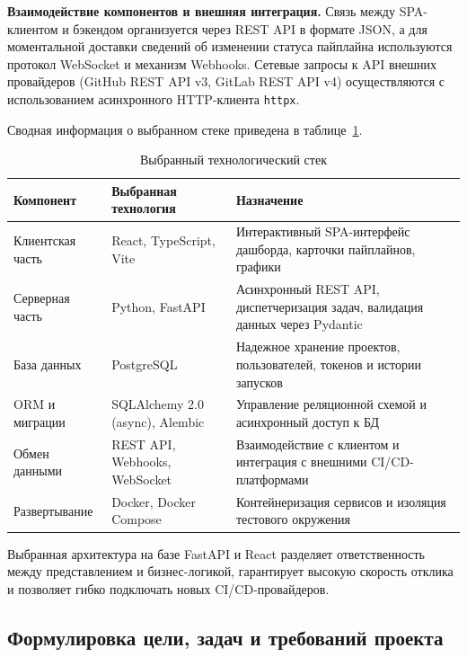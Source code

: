 \textbf{Взаимодействие компонентов и внешняя интеграция.} Связь между SPA-клиентом и бэкендом организуется через REST API в формате JSON, а для моментальной доставки сведений об изменении статуса пайплайна используются протокол WebSocket и механизм Webhooks. Сетевые запросы к API внешних провайдеров (GitHub REST API v3, GitLab REST API v4) осуществляются с использованием асинхронного HTTP-клиента \texttt{httpx}.

Сводная информация о выбранном стеке приведена в таблице~\ref{tab:stack}.

\begin{table}[H]
    \centering
    \caption{Выбранный технологический стек}
    \label{tab:stack}
    \small
    \begin{tabular}{|p{4cm}|p{4.6cm}|p{5.2cm}|}
        \hline
        \textbf{Компонент} & \textbf{Выбранная технология} & \textbf{Назначение} \\ \hline
        Клиентская часть & React, TypeScript, Vite & Интерактивный SPA-интерфейс дашборда, карточки пайплайнов, графики \\ \hline
        Серверная часть & Python, FastAPI & Асинхронный REST API, диспетчеризация задач, валидация данных через Pydantic \\ \hline
        База данных & PostgreSQL & Надежное хранение проектов, пользователей, токенов и истории запусков \\ \hline
        ORM и миграции & SQLAlchemy 2.0 (async), Alembic & Управление реляционной схемой и асинхронный доступ к БД \\ \hline
        Обмен данными & REST API, Webhooks, WebSocket & Взаимодействие с клиентом и интеграция с внешними CI/CD-платформами \\ \hline
        Развертывание & Docker, Docker Compose & Контейнеризация сервисов и изоляция тестового окружения \\ \hline
    \end{tabular}
\end{table}

Выбранная архитектура на базе FastAPI и React разделяет ответственность между представлением и бизнес-логикой, гарантирует высокую скорость отклика и позволяет гибко подключать новых CI/CD-провайдеров.

\subsection{Формулировка цели, задач и требований проекта}


